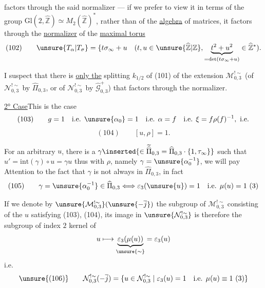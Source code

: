 
factors through the said normalizer --- if we prefer to view it in terms of the
group $\mathrm{Gl}(2,\widehat{\mathbb Z})\simeq M_2(\widehat{\mathbb Z})^*$,
rather than of the \uline{algebra} of matrices, it factors through
the \uline{normalizer} of the \uline{maximal torus}
\[
 (102)\qquad
 \unsure{T_\alpha|T_\sigma}=
 \{t\sigma_\infty+u\quad
 (t,u\in\unsure{\widehat{\mathbb Z}|\mathbb Z},
 \underbrace{t^2+u^2}_{=\det(t\sigma_\infty+u)}
 \in\widehat{\mathbb Z}^{*}).
\]

I suspect that there is \uline{only the} splitting $k_{1/2}$ of (101)
of the extension $\mathcal M_{0,3}^{!\sim}$
(of $\mathcal N_{0,3}^{!\sim}$ by $\widehat{\Pi}_{0,3}$,
 or of $\mathcal N_{0,3}^{!\sim}$
by $\widehat{\mathcal G}_{0,3}^{+}$)
that factors through the normalizer.


\uline{2° Case}\quad This is the case
\[
 (103)\qquad
 g=1\quad\text{i.e. }\unsure{\alpha_0}=1
 \quad\text{i.e. }\alpha=f
 \quad\text{i.e. }\xi=f\rho(f)^{-1},\ \text{i.e.}
\]
\[
 (104)\qquad [u,\rho]=1.
\]

For an arbitrary $u$, there is a
$\gamma\inserted{\in\widetilde{\widehat{\Pi}}_{0,3}
=\widehat{\Pi}_{0,3}\cdot\{1,\tau_\infty\}}$
 such that
$u'=\mathrm{int}(\gamma)\circ u=\gamma u$
 thus with $\rho$,
namely $\gamma=\unsure{\alpha_0^{-1}}$,
 we will pay Attention to the fact that
$\gamma$ is not always in $\widehat{\Pi}_{0,3}$, in fact
\[
 (105)\qquad
 \gamma=\unsure{\alpha_0^{-1}}\in\widehat{\Pi}_{0,3}
 \Longleftrightarrow
 \varepsilon_3(\unsure{u})=1
 \quad\text{i.e. }\mu(u)=1\ (3)
\]


If we denote by
$\unsure{\mathcal M_{0,3}^{!\sim}}(\unsure{-\overline{j}})$
the subgroup of $\mathcal M_{0,3}^{!\sim}$
consisting of the $u$ satisfying (103), (104), its image in
$\unsure{\mathcal N_{0,3}^{!\sim}}$ is therefore
the subgroup of index $2$ kernel of
\[
 u\longmapsto
 \underbrace{\varepsilon_3(\mu(u))}_{\unsure{\sim}}
 =\varepsilon_3(u)
\]
i.e.
\[
 \unsure{(106)}\qquad
 \mathcal N_{0,3}^{!\sim}(-\overline{j})
 =\{u\in\mathcal N_{0,3}^{!\sim}\mid
 \varepsilon_3(u)=1\quad
 \text{i.e. }\mu(u)\equiv1\ (3)\}
\]

